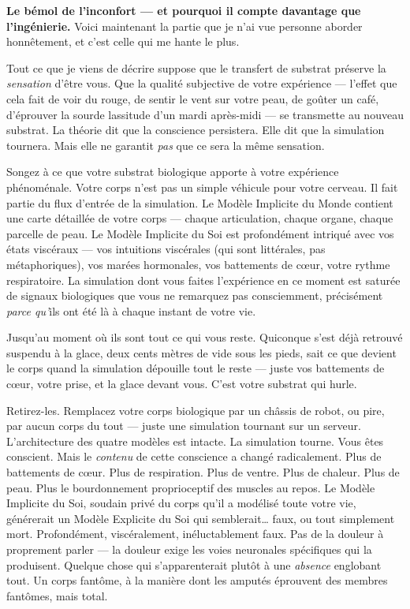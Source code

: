 \documentclass[11pt, twoside, openright]{book}
\begin{document}
\textbf{Le bémol de l'inconfort --- et pourquoi il compte davantage que l'ingénierie.} Voici maintenant la partie que je n'ai vue personne aborder honnêtement, et c'est celle qui me hante le plus.

Tout ce que je viens de décrire suppose que le transfert de substrat préserve la \textit{sensation} d'être vous. Que la qualité subjective de votre expérience --- l'effet que cela fait de voir du rouge, de sentir le vent sur votre peau, de goûter un café, d'éprouver la sourde lassitude d'un mardi après-midi --- se transmette au nouveau substrat. La théorie dit que la conscience persistera. Elle dit que la simulation tournera. Mais elle ne garantit \textit{pas} que ce sera la même sensation.

Songez à ce que votre substrat biologique apporte à votre expérience phénoménale. Votre corps n'est pas un simple véhicule pour votre cerveau. Il fait partie du flux d'entrée de la simulation. Le Modèle Implicite du Monde contient une carte détaillée de votre corps --- chaque articulation, chaque organe, chaque parcelle de peau. Le Modèle Implicite du Soi est profondément intriqué avec vos états viscéraux --- vos intuitions viscérales (qui sont littérales, pas métaphoriques), vos marées hormonales, vos battements de cœur, votre rythme respiratoire. La simulation dont vous faites l'expérience en ce moment est saturée de signaux biologiques que vous ne remarquez pas consciemment, précisément \textit{parce qu'}ils ont été là à chaque instant de votre vie.

Jusqu'au moment où ils sont tout ce qui vous reste. Quiconque s'est déjà retrouvé suspendu à la glace, deux cents mètres de vide sous les pieds, sait ce que devient le corps quand la simulation dépouille tout le reste --- juste vos battements de cœur, votre prise, et la glace devant vous. C'est votre substrat qui hurle.

Retirez-les. Remplacez votre corps biologique par un châssis de robot, ou pire, par aucun corps du tout --- juste une simulation tournant sur un serveur. L'architecture des quatre modèles est intacte. La simulation tourne. Vous êtes conscient. Mais le \textit{contenu} de cette conscience a changé radicalement. Plus de battements de cœur. Plus de respiration. Plus de ventre. Plus de chaleur. Plus de peau. Plus le bourdonnement proprioceptif des muscles au repos. Le Modèle Implicite du Soi, soudain privé du corps qu'il a modélisé toute votre vie, générerait un Modèle Explicite du Soi qui semblerait\ldots{} faux, ou tout simplement mort. Profondément, viscéralement, inéluctablement faux. Pas de la douleur à proprement parler --- la douleur exige les voies neuronales spécifiques qui la produisent. Quelque chose qui s'apparenterait plutôt à une \textit{absence} englobant tout. Un corps fantôme, à la manière dont les amputés éprouvent des membres fantômes, mais total.
\end{document}
